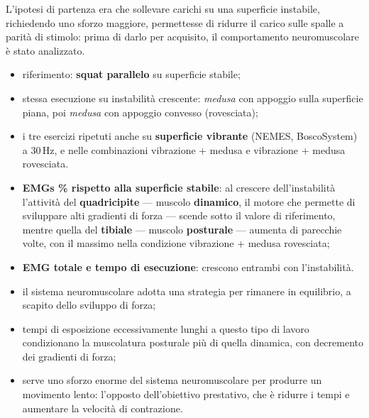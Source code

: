 L'ipotesi di partenza era che sollevare carichi su una superficie instabile, richiedendo uno sforzo
maggiore, permettesse di ridurre il carico sulle spalle a parità di stimolo: prima di darlo per
acquisito, il comportamento neuromuscolare è stato analizzato.

\begin{itemize}
  \item riferimento: \textbf{squat parallelo} su superficie stabile;
  \item stessa esecuzione su instabilità crescente: \textit{medusa} con appoggio sulla superficie
    piana, poi \textit{medusa} con appoggio convesso (rovesciata);
  \item i tre esercizi ripetuti anche su \textbf{superficie vibrante} (NEMES, BoscoSystem) a 30\,Hz,
    e nelle combinazioni vibrazione + medusa e vibrazione + medusa rovesciata.
\end{itemize}

\begin{itemize}
  \item \textbf{EMGs \% rispetto alla superficie stabile}: al crescere dell'instabilità l'attività
    del \textbf{quadricipite} --- muscolo \textbf{dinamico}, il motore che permette di sviluppare
    alti gradienti di forza --- scende sotto il valore di riferimento, mentre quella del
    \textbf{tibiale} --- muscolo \textbf{posturale} --- aumenta di parecchie volte, con il massimo
    nella condizione vibrazione + medusa rovesciata;
  \item \textbf{EMG totale e tempo di esecuzione}: crescono entrambi con l'instabilità.
\end{itemize}

\begin{itemize}
  \item il sistema neuromuscolare adotta una strategia per rimanere in equilibrio, a scapito dello
    sviluppo di forza;
  \item tempi di esposizione eccessivamente lunghi a questo tipo di lavoro condizionano la
    muscolatura posturale più di quella dinamica, con decremento dei gradienti di forza;
  \item serve uno sforzo enorme del sistema neuromuscolare per produrre un movimento lento:
    l'opposto dell'obiettivo prestativo, che è ridurre i tempi e aumentare la velocità di
    contrazione.
\end{itemize}


